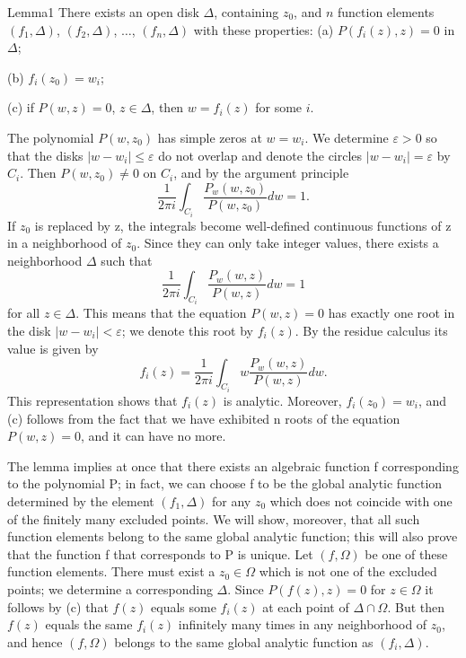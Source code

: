 \begin{originalstatement}{Lemma}{1}\label{lem:8.1}
There exists an open disk $\Delta$, containing $z_0$, and $n$ function elements $(f_1, \Delta)$, $(f_2, \Delta)$, $\ldots$, $(f_n, \Delta)$ with these properties:
(a) $P(f_{i}(z),z) = 0$ in $\Delta$;

(b) $f_{i}(z_{0}) = w_{i}$;

(c) if $P(w,z) = 0$, $z \in \Delta$, then $w = f_i(z)$ for some $i$.

\end{originalstatement}
The polynomial $P(w, z_0)$ has simple zeros at $w = w_i$. We determine $\varepsilon > 0$ so that the disks $|w - w_i| \leq \varepsilon$ do not overlap and denote the circles $|w - w_i| = \varepsilon$ by $C_i$. Then $P(w, z_0) \neq 0$ on $C_i$, and by the argument principle
\begin{equation*}
\frac {1}{2 \pi i} \int_ {C _ {i}} \frac {P _ {w} (w , z _ {0})}{P (w , z _ {0})} d w = 1.
\end{equation*}
If $z_{0}$ is replaced by z, the integrals become well-defined continuous functions of z in a neighborhood of $z_{0}$. Since they can only take integer values, there exists a neighborhood $\Delta$ such that
\begin{equation*}
\frac {1}{2 \pi i} \int_ {C _ {i}} \frac {P _ {w} (w , z)}{P (w , z)} d w = 1
\end{equation*}
for all $z \in \Delta$. This means that the equation $P(w, z) = 0$ has exactly one root in the disk $|w - w_i| < \varepsilon$; we denote this root by $f_i(z)$. By the residue calculus its value is given by
\begin{equation*}
f _ {i} (z) = \frac {1}{2 \pi i} \int_ {C _ {i}} w \frac {P _ {w} (w , z)}{P (w , z)} d w.
\end{equation*}
This representation shows that $f_{i}(z)$ is analytic. Moreover, $f_{i}(z_{0}) = w_{i}$, and (c) follows from the fact that we have exhibited n roots of the equation $P(w,z) = 0$, and it can have no more.

The lemma implies at once that there exists an algebraic function f corresponding to the polynomial P; in fact, we can choose f to be the global analytic function determined by the element $(f_{1},\Delta)$ for any $z_{0}$ which does not coincide with one of the finitely many excluded points. We will show, moreover, that all such function elements belong to the same global analytic function; this will also prove that the function f that corresponds to P is unique. Let $(f,\Omega)$ be one of these function elements. There must exist a $z_{0}\in\Omega$ which is not one of the excluded points; we determine a corresponding $\Delta$. Since $P(f(z),z)=0$ for $z\in\Omega$ it follows by (c) that $f(z)$ equals some $f_{i}(z)$ at each point of $\Delta\cap\Omega$. But then $f(z)$ equals the same $f_{i}(z)$ infinitely many times in any neighborhood of $z_{0}$, and hence $(f,\Omega)$ belongs to the same global analytic function as $(f_{i},\Delta)$.

